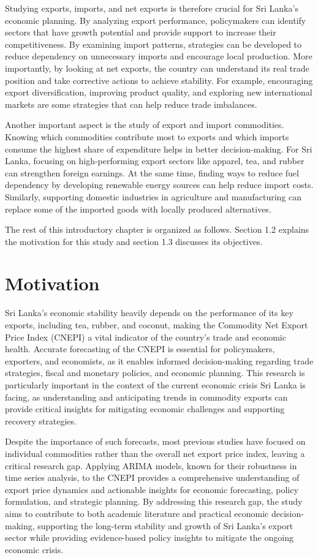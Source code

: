 \documentclass[12pt,a4paper]{report} %
\begin{document}
	Studying exports, imports, and net exports is therefore crucial for Sri Lanka’s economic planning. By analyzing export performance, policymakers can identify sectors that have growth potential and provide support to increase their competitiveness. By examining import patterns, strategies can be developed to reduce dependency on unnecessary imports and encourage local production. More importantly, by looking at net exports, the country can understand its real trade position and take corrective actions to achieve stability. For example, encouraging export diversification, improving product quality, and exploring new international markets are some strategies that can help reduce trade imbalances.
	
	Another important aspect is the study of export and import commodities. Knowing which commodities contribute most to exports and which imports consume the highest share of expenditure helps in better decision-making. For Sri Lanka, focusing on high-performing export sectors like apparel, tea, and rubber can strengthen foreign earnings. At the same time, finding ways to reduce fuel dependency by developing renewable energy sources can help reduce import costs. Similarly, supporting domestic industries in agriculture and manufacturing can replace some of the imported goods with locally produced alternatives.
	
	The rest of this introductory chapter is organized as follows. Section 1.2 explains the motivation for this study and section 1.3 discusses its objectives.
	
	\section{Motivation}
	
	Sri Lanka's economic stability heavily depends on the performance of its key exports, including tea, rubber, and coconut, making the Commodity Net Export Price Index (CNEPI) a vital indicator of the country's trade and economic health. Accurate forecasting of the CNEPI is essential for policymakers, exporters, and economists, as it enables informed decision-making regarding trade strategies, fiscal and monetary policies, and economic planning. This research is particularly important in the context of the current economic crisis Sri Lanka is facing, as understanding and anticipating trends in commodity exports can provide critical insights for mitigating economic challenges and supporting recovery strategies. 
	
	Despite the importance of such forecasts, most previous studies have focused on individual commodities rather than the overall net export price index, leaving a critical research gap. Applying ARIMA models, known for their robustness in time series analysis, to the CNEPI provides a comprehensive understanding of export price dynamics and actionable insights for economic forecasting, policy formulation, and strategic planning. By addressing this research gap, the study aims to contribute to both academic literature and practical economic decision-making, supporting the long-term stability and growth of Sri Lanka’s export sector while providing evidence-based policy insights to mitigate the ongoing economic crisis.
	
\end{document}
